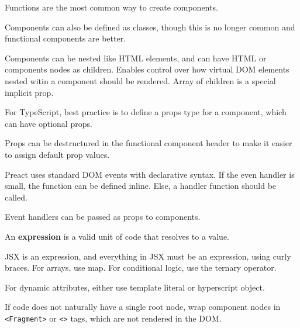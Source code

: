 \documentclass[11pt]{article}
\begin{document}
Functions are the most common way to create components.

Components can also be defined as classes, though this is no longer common and functional
components are better.

Components can be nested like HTML elements, and can have HTML or components nodes as children.
Enables control over how virtual DOM elements nested witin a component should be rendered.
Array of children is a special implicit prop.

For TypeScript, best practice is to define a props type for a component, which can have
optional props.

Props can be destructured in the functional component header to make it easier to assign
default prop values.

Preact uses standard DOM events with declarative syntax.
If the even handler is small, the function can be defined inline.
Else, a handler function should be called.

Event handlers can be passed as props to components.

An \textbf{expression} is a valid unit of code that resolves to a value.

JSX is an expression, and everything in JSX must be an expression, using curly braces.
For arrays, use map. For conditional logic, use the ternary operator.

For dynamic attributes, either use template literal or hyperscript object.

If code does not naturally have a single root node, wrap component nodes in
\texttt{<Fragment>} or \texttt{<>} tags, which are not rendered in the DOM.
\end{document}
